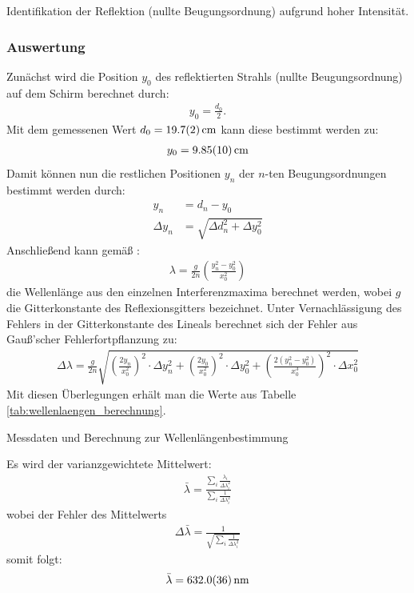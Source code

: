 \documentclass[11pt, a4paper]{article}
\numberwithin{equation}{section}
\begin{document}
Identifikation der Reflektion (nullte Beugungsordnung) aufgrund hoher Intensität.


\subsubsection{Auswertung}

Zunächst wird die Position $y_0$ des reflektierten Strahls (nullte Beugungsordnung) auf dem Schirm berechnet durch:
\begin{align}
	y_0 = \frac{d_0}{2} \text{.}
\end{align}
Mit dem gemessenen Wert $d_0 = \SI{19.7 +- 0.2}{\centi\metre}$ kann diese bestimmt werden zu:
\begin{align}
	y_0 = \SI{9.85 +- 0.10}{\centi\metre}
\end{align}
Damit können nun die restlichen Positionen $y_n$ der $n$-ten Beugungsordnungen bestimmt werden durch:
\begin{align}
	y_n &= d_n - y_0 \\
	\Delta y_n &= \sqrt{\Delta d_n^2 + \Delta y_0^2}
\end{align}
Anschließend kann gemäß \cite{schawlow}:
\begin{align}
	\lambda = \frac{g}{2 n} \left( \frac{y_n^2 - y_0^2}{x_0^2} \right)
\end{align}
die Wellenlänge aus den einzelnen Interferenzmaxima berechnet werden, wobei $g$ die Gitterkonstante des Reflexionsgitters bezeichnet.
Unter Vernachlässigung des Fehlers in der Gitterkonstante des Lineals berechnet sich der Fehler aus Gauß'scher Fehlerfortpflanzung zu:
\begin{align}
	\Delta \lambda = \frac{g}{2 n} \sqrt{\left( \frac{2 y_n}{x_0^2} \right)^2 \cdot \Delta y_n^2 + \left( \frac{2 y_0}{x_0^2} \right)^2 \cdot \Delta y_0^2 + \left(\frac{2\left(y_n^2 - y_0^2 \right)}{x_0^3}\right)^2 \cdot \Delta x_0^2}
\end{align}
Mit diesen Überlegungen erhält man die Werte aus Tabelle \ref{tab:wellenlaengen_berechnung}.
\begin{table}[h]
	\centering
	
	\caption{Messdaten und Berechnung zur Wellenlängenbestimmung}
	\label{tab:wellenlaengen_berechnung}
\end{table}
Es wird der varianzgewichtete Mittelwert:
\begin{align}
	\bar{\lambda} = \frac{\sum_i \frac{\lambda_i}{\Delta \lambda_i^2}}{\sum_i \frac{1}{\Delta \lambda_i^2}}
\end{align}
wobei der Fehler des Mittelwerts
\begin{align}
\Delta \bar{\lambda} = \frac{1}{\sqrt{\sum_i \frac{1}{\Delta \lambda_i^2}}}
\end{align}
somit folgt:
\begin{align}
	\bar{\lambda} = \SI{632.0 +- 3.6}{\nano\metre}
\end{align}
\end{document}
